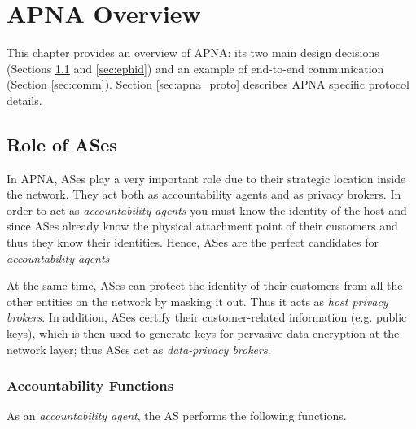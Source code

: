 
\chapter{APNA Overview} %

\label{overview} %
This chapter provides an overview of APNA: its two main design decisions (Sections \ref{sec:role_as} and \ref{sec:ephid}) and an example of end-to-end communication (Section \ref{sec:comm}). Section \ref{sec:apna_proto} describes APNA specific protocol details.

\section{Role of ASes} \label{sec:role_as}
In APNA, ASes play a very important role due to their strategic location inside the network. They act both as accountability agents and as privacy brokers. In order to act as \textit{accountability agents} you must know the identity of the host and since ASes already know the physical attachment point of their customers and thus they know their identities. Hence, ASes are the perfect candidates for  \textit{accountability agents} 

At the same time, ASes can protect the identity of their customers from all the other entities on the network by masking it out. Thus it acts as \textit{host privacy brokers}. In addition, ASes certify their customer-related information (e.g. public keys), which is then used to generate keys for pervasive data encryption at the network layer; thus ASes act as \textit{data-privacy brokers}.

\subsection{Accountability Functions}
As an \textit{accountability agent}, the AS performs the following functions.

